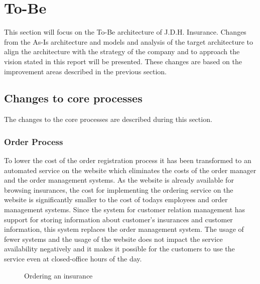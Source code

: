 \section{To-Be}
\label{sec:to_be}
This section will focus on the To-Be architecture of J.D.H. Insurance. Changes from the As-Is architecture and models and analysis of the target architecture to align the architecture with the strategy of the company and to approach the vision stated in this report will be presented. These changes are based on the improvement areas described in the previous section.
\subsection{Changes to core processes}
The changes to the core processes are described during this section.
\subsubsection{Order Process}
To lower the cost of the order registration process it has been transformed to an automated service on the website which eliminates the costs of the order manager and the order management systems. As the website is already available for browsing insurances, the cost for implementing the ordering service on the website is significantly smaller to the cost of todays employees and order management systems. Since the system for customer relation management has support for storing information about customer's insurances and customer information, this system replaces the order management system. The usage of fewer systems and the usage of the website does not impact the service availability negatively and it makes it possible for the customers to use the service even at closed-office hours of the day.
\begin{center}
	\begin{figure}[H]
		\centering
		\setlength\fboxsep{7pt}
		\setlength\fboxrule{0.5pt}
		\caption{Ordering an insurance}
		\label{fig:map_order_tobe}
	\end{figure}
\end{center}

